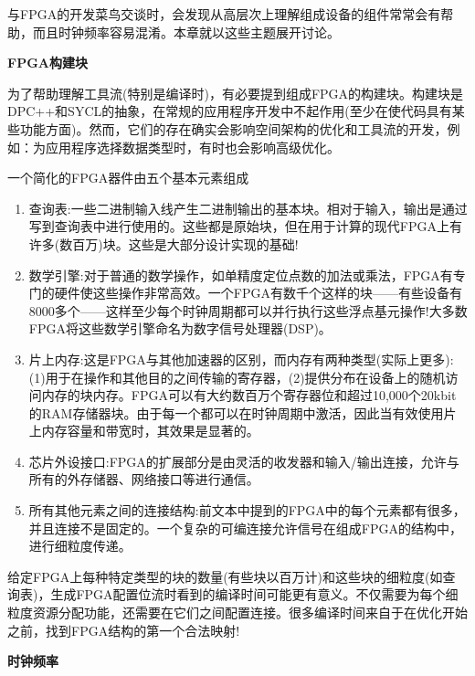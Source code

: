 与FPGA的开发菜鸟交谈时，会发现从高层次上理解组成设备的组件常常会有帮助，而且时钟频率容易混淆。本章就以这些主题展开讨论。\par

\hspace*{\fill} \par %
\textbf{FPGA构建块}

为了帮助理解工具流(特别是编译时)，有必要提到组成FPGA的构建块。构建块是DPC++和SYCL的抽象，在常规的应用程序开发中不起作用(至少在使代码具有某些功能方面)。然而，它们的存在确实会影响空间架构的优化和工具流的开发，例如：为应用程序选择数据类型时，有时也会影响高级优化。\par

一个简化的FPGA器件由五个基本元素组成\par

\begin{enumerate}
	\item 查询表:一些二进制输入线产生二进制输出的基本块。相对于输入，输出是通过写到查询表中进行使用的。这些都是原始块，但在用于计算的现代FPGA上有许多(数百万)块。这些是大部分设计实现的基础!
	\item 数学引擎:对于普通的数学操作，如单精度定位点数的加法或乘法，FPGA有专门的硬件使这些操作非常高效。一个FPGA有数千个这样的块——有些设备有8000多个——这样至少每个时钟周期都可以并行执行这些浮点基元操作!大多数FPGA将这些数学引擎命名为数字信号处理器(DSP)。
	\item 片上内存:这是FPGA与其他加速器的区别，而内存有两种类型(实际上更多):(1)用于在操作和其他目的之间传输的寄存器，(2)提供分布在设备上的随机访问内存的块内存。FPGA可以有大约数百万个寄存器位和超过10,000个20kbit的RAM存储器块。由于每一个都可以在时钟周期中激活，因此当有效使用片上内存容量和带宽时，其效果是显著的。
	\item 芯片外设接口:FPGA的扩展部分是由灵活的收发器和输入/输出连接，允许与所有的外存储器、网络接口等进行通信。
	\item 所有其他元素之间的连接结构:前文本中提到的FPGA中的每个元素都有很多，并且连接不是固定的。一个复杂的可编连接允许信号在组成FPGA的结构中，进行细粒度传递。
\end{enumerate}

给定FPGA上每种特定类型的块的数量(有些块以百万计)和这些块的细粒度(如查询表)，生成FPGA配置位流时看到的编译时间可能更有意义。不仅需要为每个细粒度资源分配功能，还需要在它们之间配置连接。很多编译时间来自于在优化开始之前，找到FPGA结构的第一个合法映射!\par

\hspace*{\fill} \par %
\textbf{时钟频率}

